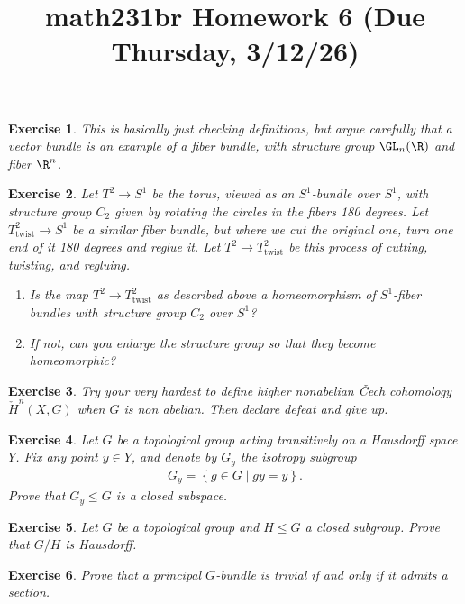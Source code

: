 \documentclass[11pt]{amsart}
\title{math231br Homework 6 (Due Thursday, 3/12/26)}
\newtheorem{hwexercise}{Exercise}
\begin{document}
\maketitle


\begin{hwexercise} This is basically just checking definitions, but argue carefully that a vector bundle is an example of a fiber bundle, with structure group $\GL_n(\R)$ and fiber $\R^n$.
\end{hwexercise}

\begin{hwexercise} Let $T^2 \to S^1$ be the torus, viewed as an $S^1$-bundle over $S^1$, with structure group $C_2$ given by rotating the circles in the fibers 180 degrees. Let $T^2_\text{twist} \to S^1$ be a similar fiber bundle, but where we cut the original one, turn one end of it 180 degrees and reglue it. Let $T^2 \to T^2_\text{twist}$ be this process of cutting, twisting, and regluing.
\begin{enumerate}
    \item Is the map $T^2 \to T^2_\text{twist}$ as described above a homeomorphism of $S^1$-fiber bundles with structure group $C_2$ over $S^1$?
    \item If not, can you enlarge the structure group so that they become homeomorphic?
\end{enumerate}
\end{hwexercise}

\begin{hwexercise} Try your very hardest to define higher nonabelian \v{C}ech cohomology $\check{H}^n(X,G)$ when $G$ is non abelian. Then declare defeat and give up.
\end{hwexercise}

\begin{hwexercise} Let $G$ be a topological group acting transitively on a Hausdorff space $Y$. Fix any point $y\in Y$, and denote by $G_y$ the isotropy subgroup
\begin{align*}
    G_y = \left\{ g\in G \mid gy =y \right\}.
\end{align*}
Prove that $G_y \le G$ is a closed subspace.
\end{hwexercise}

\begin{hwexercise} Let $G$ be a topological group and $H \le G$ a closed subgroup. Prove that $G/H$ is Hausdorff.
\end{hwexercise}

\begin{hwexercise} Prove that a principal $G$-bundle is trivial if and only if it admits a section.
\end{hwexercise}
\end{document}
